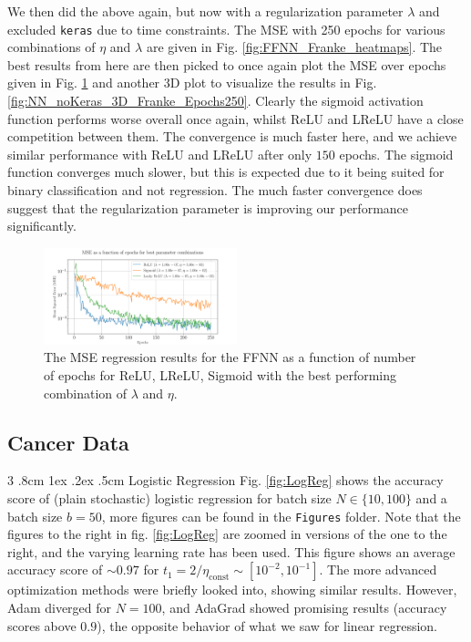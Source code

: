 \documentclass[%
reprint,s
amsmath,amssymb,
aps,
]{revtex4-2}
\makeatletter
\renewcommand{\subsubsection}{%
	\@startsection
	{subsubsection}%
	{3}%
	{\z@}%
	{.8cm \@plus1ex \@minus .2ex}%
	{.5cm}%
	{\normalfont\small\centering}%
}
\makeatother
\begin{document}
We then did the above again, but now with a regularization parameter $\lambda$ and excluded \texttt{keras} due to time constraints. The MSE with 250 epochs for various combinations of $\eta$ and $\lambda$ are given in Fig. \ref{fig:FFNN_Franke_heatmaps}. The best results from here are then picked to once again plot the MSE over epochs given in Fig. \ref{fig:best_MSE_Franke_Epochs} and another 3D plot to visualize the results in Fig. \ref{fig:NN_noKeras_3D_Franke_Epochs250}. Clearly the sigmoid activation function performs worse overall once again, whilst ReLU and LReLU have a close competition between them. The convergence is much faster here, and we achieve similar performance with ReLU and LReLU after only $150$ epochs. The sigmoid function converges much slower, but this is expected due to it being suited for binary classification and not regression. The much faster convergence does suggest that the regularization parameter is improving our performance significantly.
\begin{figure}[ht!]
	\includegraphics[width=0.5\textwidth]{Figures/Best_MSE_vs_Epochs250.pdf}
	\caption{The MSE regression results for the FFNN as a function of number of epochs for ReLU, LReLU, Sigmoid with the best performing combination of $\lambda$ and $\eta$.}
	\label{fig:best_MSE_Franke_Epochs}
\end{figure}

\subsection{Cancer Data}
\subsubsection{Logistic Regression} \label{sec:cancer_data_logisit_regression}
Fig. \ref{fig:LogReg} shows the accuracy score of (plain stochastic) logistic regression for batch size \(N\in\{10, 100\}\) and a batch size \(b=50\), more figures can be found in the \texttt{Figures} folder. Note that the figures to the right in fig. \ref{fig:LogReg} are zoomed in versions of the one to the right, and the varying learning rate has been used. This figure shows an average accuracy score of \(\sim 0.97\) for \(t_1 = 2/\eta_{\text{const}} \sim[10^{-2}, 10^{-1}]\). The more advanced optimization methods were briefly looked into, showing similar results. However, Adam diverged for \(N=100\), and AdaGrad showed promising results (accuracy scores above \(0.9\)), the opposite behavior of what we saw for linear regression.
\end{document}
